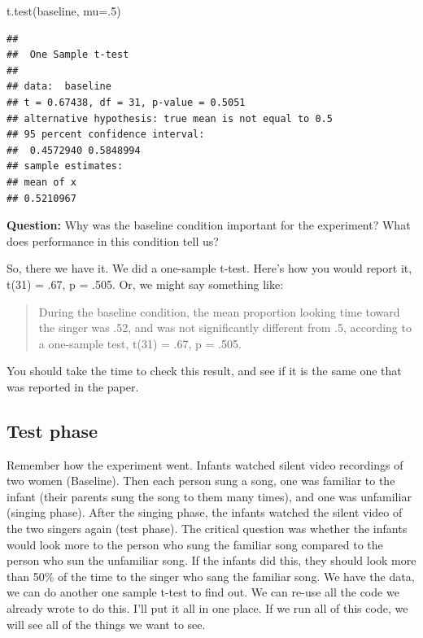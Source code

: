 \documentclass[
]{book}
\newenvironment{Shaded}{\begin{snugshade}}{\end{snugshade}}
\newcommand{\AttributeTok}[1]{\textcolor[rgb]{0.77,0.63,0.00}{#1}}
\newcommand{\DecValTok}[1]{\textcolor[rgb]{0.00,0.00,0.81}{#1}}
\newcommand{\FunctionTok}[1]{\textcolor[rgb]{0.00,0.00,0.00}{#1}}
\newcommand{\NormalTok}[1]{#1}
\begin{document}
\begin{Shaded}
\begin{Highlighting}[]
\FunctionTok{t.test}\NormalTok{(baseline, }\AttributeTok{mu=}\NormalTok{.}\DecValTok{5}\NormalTok{)}
\end{Highlighting}
\end{Shaded}

\begin{verbatim}
## 
##  One Sample t-test
## 
## data:  baseline
## t = 0.67438, df = 31, p-value = 0.5051
## alternative hypothesis: true mean is not equal to 0.5
## 95 percent confidence interval:
##  0.4572940 0.5848994
## sample estimates:
## mean of x 
## 0.5210967
\end{verbatim}

\textbf{Question:} Why was the baseline condition important for the experiment? What does performance in this condition tell us?

So, there we have it. We did a one-sample t-test. Here's how you would report it, t(31) = .67, p = .505. Or, we might say something like:

\begin{quote}
During the baseline condition, the mean proportion looking time toward the singer was .52, and was not significantly different from .5, according to a one-sample test, t(31) = .67, p = .505.
\end{quote}

You should take the time to check this result, and see if it is the same one that was reported in the paper.

\hypertarget{test-phase}{%
\subsection{Test phase}\label{test-phase}}

Remember how the experiment went. Infants watched silent video recordings of two women (Baseline). Then each person sung a song, one was familiar to the infant (their parents sung the song to them many times), and one was unfamiliar (singing phase). After the singing phase, the infants watched the silent video of the two singers again (test phase). The critical question was whether the infants would look more to the person who sung the familiar song compared to the person who sun the unfamiliar song. If the infants did this, they should look more than 50\% of the time to the singer who sang the familiar song. We have the data, we can do another one sample t-test to find out. We can re-use all the code we already wrote to do this. I'll put it all in one place. If we run all of this code, we will see all of the things we want to see.
\end{document}
